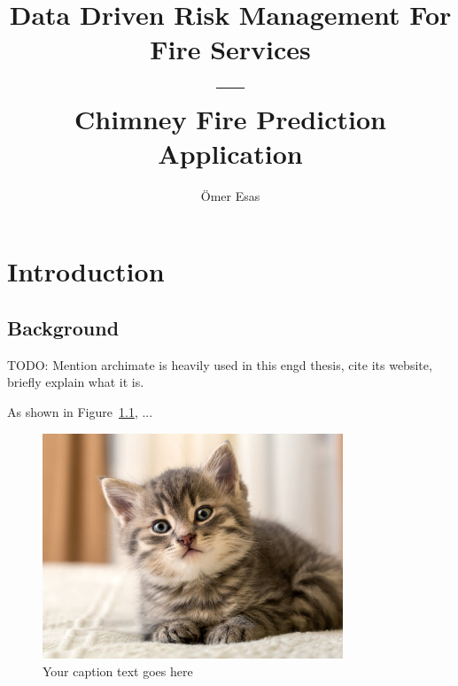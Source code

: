 \documentclass{utitcphd_overleaf}
\title{\texorpdfstring{Data Driven Risk Management For Fire Services\\ ---\\Chimney Fire Prediction Application}{Data Driven Risk Management For Fire Services - Chimney Fire Prediction Application}}
\author{Ömer Esas}                                         %
\begin{document}

\openright
\frontmatter

% 
% 
% 

\tableofcontents

\mainmatter

\chapter{Introduction}
\label{chap:introduction}


\section{Background}

TODO: Mention archimate is heavily used in this engd thesis, cite its website, briefly explain what it is.

As shown in Figure~\ref{fig:yourlabel}, ...

\begin{figure}[ht]
  \centering
  \includegraphics[width=0.8\textwidth]{my_images/kitten.jpeg}
  \caption{Your caption text goes here}
  \label{fig:yourlabel}
\end{figure}
\end{document}
